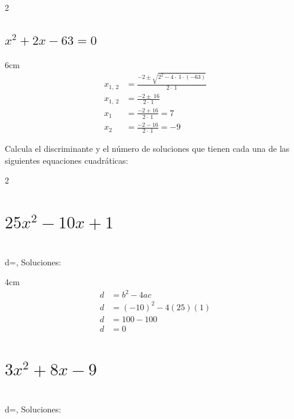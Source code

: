 \documentclass[12pt,addpoints,answers]{evalua}
\begin{document}
\begin{questions}
\begin{multicols}{2}
\begin{parts}
            \part {\Large $x^2+2x-63=0$}

            \begin{solutionbox}{6cm}
                \begin{align*}
                    x_{1,\:2} & =\frac{-2\pm \sqrt{2^2-4\cdot \:1\cdot \left(-63\right)}}{2\cdot \:1} \\
                    x_{1,\:2} & =\frac{-2\pm \:16}{2\cdot \:1}                                        \\
                    x_1       & =\frac{-2+16}{2\cdot \:1}=7                                           \\
                    x_2       & =\frac{-2-16}{2\cdot \:1}=-9
                \end{align*}
            \end{solutionbox}

        \end{parts}
    \end{multicols}

    \question[8] Calcula el discriminante y el número de soluciones que tienen cada una de las siguientes equaciones cuadráticas:
    \begin{multicols}{2}
        \begin{parts}
            \part {\Large$25x^2-10x+1$} \\ d=\fillin[$0$][1cm], Soluciones: \fillin[$1$][1cm]

            \begin{solutionbox}{4cm}
                \begin{align*}
                    d & = b^2-4ac          \\
                    d & = (-10)^2-4(25)(1) \\
                    d & = 100-100          \\
                    d & = 0
                \end{align*}
            \end{solutionbox}

            \part {\Large $3x^2+8x-9$} \\ d=\fillin[$172$][1cm], Soluciones: \fillin[$2$][1cm]


\end{parts}
\end{multicols}
\end{questions}
\end{document}
